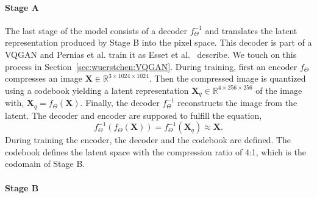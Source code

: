 \paragraph*{Stage A} The last stage of the model consists of a decoder
$f_{\Theta}^{-1}$ and translates the latent representation produced by Stage B into
the pixel space. This decoder is part of a VQGAN and Pernias et al. train it as
Esset et al.~\cite{esser2021tamingtransformershighresolutionimage} describe.
We touch on this process in Section~\ref{sec:wuerstchen:VQGAN}. During training,
first an encoder $f_{\Theta}$ compresses an image $\boldsymbol{X}\in\mathbb{R}^{3\times1024\times1024}$. Then the compressed image is
quantized using a codebook yielding a latent representation $\boldsymbol{X}_q\in\mathbb{R}^{4\times256\times256}$ of the image with,
$\boldsymbol{X}_q = f_{\Theta}(\boldsymbol{X}).$
Finally, the decoder $f_{\Theta}^{-1}$ reconstructs the image from the latent.
The decoder and encoder are supposed to fulfill the equation,
\begin{equation}
    f_{\Theta}^{-1}(f_{\Theta}(\boldsymbol{X})) = f_{\Theta}^{-1}(\boldsymbol{X}_q) \approx \boldsymbol{X}.
\end{equation}
During training the encoder, the decoder and the codebook are defined. The
codebook defines the latent space with the compression ratio of 4:1, which is
the codomain of Stage B.

\paragraph*{Stage B}



